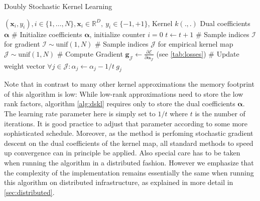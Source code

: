 \documentclass{article} %
\newcommand{\R}{\ensuremath{\mathds{R}}}
\newcommand{\va}{\boldsymbol{\alpha}}
\newcommand{\Bx}{\mathbf{x}}
\renewcommand{\vec}[1]{\mathbf{#1}}
\begin{document}
% 
\begin{algorithm}
  \begin{algorithmic}
    \caption{Doubly Stochastic Kernel Learning\label{alg:dskl}}
     \REQUIRE $(\Bx_i,y_i),i\in\{1,\dots,N\},\Bx_i\in\R^{D},~y_i\in\{-1,+1\}$, Kernel $k(.,.)$
    \ENSURE Dual coefficients $\va$ 
   \STATE \# Initialize coefficients $\va$, initialize counter $i=0$
   \STATE $t\gets t+1$
   \STATE \# Sample indices $\mathcal{I}$ for gradient 
   \STATE $\mathcal{I}\sim\text{unif}(1,N)$
   \STATE \# Sample indices $\mathcal{J}$ for empirical kernel map
   \STATE $\mathcal{J}\sim\text{unif}(1,N)$
   \STATE \# Compute Gradient
   \STATE $\vec{g}_{\mathcal{J}} \gets \frac{\partial \mathcal{E}}{\partial\va_{\mathcal{J}}}$ (see \autoref{tab:losses})
   \STATE \# Update weight vector 
   \STATE $\forall j\in\mathcal{J}: \alpha_j\gets\alpha_j - 1/t~ g_j$ 
   \ENDWHILE
  \end{algorithmic}
\end{algorithm}
%
Note that in contrast to many other kernel approximations the memory footprint of this algorithm is low: While low-rank approximations need to store the low rank factors, algorithm \autoref{alg:dskl} requires only to store the dual coefficients $\va$. 
The learning rate parameter here is simply set to $1/t$ where $t$ is the number of iterations. It is good practice to adjust that parameter according to some more sophisticated schedule. Moreover, as the method is perfoming stochastic gradient descent on the dual coefficients of the kernel map, all standard methods to speed up convergence can in principle be applied. Also special care has to be taken when running the algorithm in a distributed fashion. However we emphasize that the complexity of the implementation remains essentially the same when running this algorithm on distributed infrastructure, as explained in more detail in \autoref{sec:distributed}.
%
\end{document}
